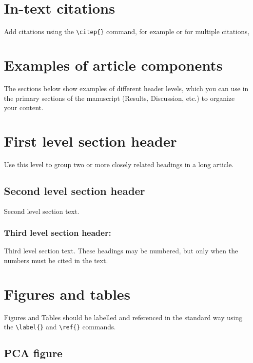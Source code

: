 \documentclass[9pt,twocolumn,twoside,lineno]{gsajnl}
\begin{document}
\section{In-text citations}

Add citations using the \verb|\citep{}| command, for example \citep{neher2013genealogies} or for multiple citations, \citep{neher2013genealogies, rodelsperger2014characterization,Falush16}

\section{Examples of article components}
\label{sec:examples}

The sections below show examples of different header levels, which you can use in the primary sections of the manuscript (Results, Discussion, etc.) to organize your content.

\section{First level section header}

Use this level to group two or more closely related headings in a long article.

\subsection{Second level section header}

Second level section text.

\subsubsection{Third level section header:}

Third level section text. These headings may be numbered, but only when the numbers must be cited in the text.

\section{Figures and tables}

Figures and Tables should be labelled and referenced in the standard way using the \verb|\label{}| and \verb|\ref{}| commands.

\subsection{PCA figure}
\end{document}
